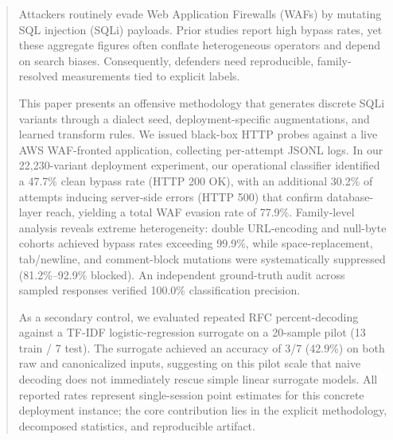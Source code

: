 \begin{abstract}
Attackers routinely evade Web Application Firewalls (WAFs) by mutating SQL injection (SQLi) payloads. Prior studies report high bypass rates, yet these aggregate figures often conflate heterogeneous operators and depend on search biases. Consequently, defenders need reproducible, family-resolved measurements tied to explicit labels.

This paper presents an offensive methodology that generates discrete SQLi variants through a dialect seed, deployment-specific augmentations, and learned transform rules. We issued black-box HTTP probes against a live AWS WAF-fronted application, collecting per-attempt JSONL logs. In our 22,230-variant deployment experiment, our operational classifier identified a 47.7\% clean bypass rate (HTTP 200 OK), with an additional 30.2\% of attempts inducing server-side errors (HTTP 500) that confirm database-layer reach, yielding a total WAF evasion rate of 77.9\%. Family-level analysis reveals extreme heterogeneity: double URL-encoding and null-byte cohorts achieved bypass rates exceeding 99.9\%, while space-replacement, tab/newline, and comment-block mutations were systematically suppressed (81.2\%--92.9\% blocked). An independent ground-truth audit across sampled responses verified 100.0\% classification precision.

As a secondary control, we evaluated repeated RFC percent-decoding against a TF-IDF logistic-regression surrogate on a 20-sample pilot (13 train / 7 test). The surrogate achieved an accuracy of 3/7 (42.9\%) on both raw and canonicalized inputs, suggesting on this pilot scale that naive decoding does not immediately rescue simple linear surrogate models. All reported rates represent single-session point estimates for this concrete deployment instance; the core contribution lies in the explicit methodology, decomposed statistics, and reproducible artifact.
\end{abstract}

